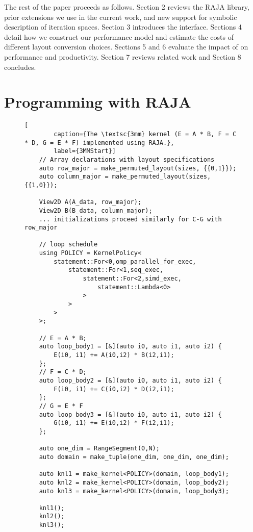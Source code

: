 The rest of the paper proceeds as follows. 
Section 2 reviews the RAJA library, prior extensions we use in the current work, and new support for symbolic description of iteration spaces.
Section 3 introduces the \FormatDecisions{} interface.
Sections 4 detail how we construct our performance model and estimate the costs of different layout conversion choices.
Sections 5 and 6 evaluate the impact of \FormatDecisions{}  on performance and productivity.
Section 7 reviews related work and Section 8 concludes.



\section{Programming with RAJA}

\begin{figure}
	\begin{lstlisting}[
		caption={The \textsc{3mm} kernel (E = A * B, F = C * D, G = E * F) implemented using RAJA.},
		label={3MMStart}]
	// Array declarations with layout specifications
	auto row_major = make_permuted_layout(sizes, {{0,1}});
	auto column_major = make_permuted_layout(sizes, {{1,0}});

	View2D A(A_data, row_major);
	View2D B(B_data, column_major);
	... initializations proceed similarly for C-G with row_major

	// loop schedule
	using POLICY = KernelPolicy<
		statement::For<0,omp_parallel_for_exec,
			statement::For<1,seq_exec,
				statement::For<2,simd_exec,
					statement::Lambda<0>
				>
			>
		>
	>;

	// E = A * B;
	auto loop_body1 = [&](auto i0, auto i1, auto i2) {
		E(i0, i1) += A(i0,i2) * B(i2,i1);
	};
	// F = C * D;
	auto loop_body2 = [&](auto i0, auto i1, auto i2) {
		F(i0, i1) += C(i0,i2) * D(i2,i1);
	};
	// G = E * F
	auto loop_body3 = [&](auto i0, auto i1, auto i2) {
		G(i0, i1) += E(i0,i2) * F(i2,i1);
	};
	
	auto one_dim = RangeSegment(0,N);
	auto domain = make_tuple(one_dim, one_dim, one_dim);

	auto knl1 = make_kernel<POLICY>(domain, loop_body1);
	auto knl2 = make_kernel<POLICY>(domain, loop_body2);
	auto knl3 = make_kernel<POLICY>(domain, loop_body3);

	knl1();
	knl2();
	knl3();
	\end{lstlisting}

\end{figure}

\label{sec:kernelObjects}

